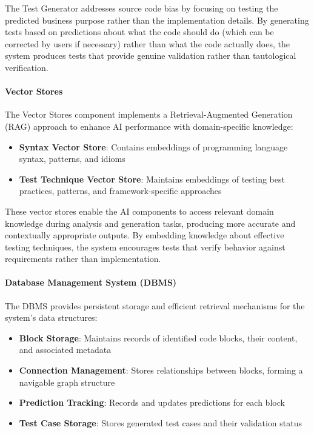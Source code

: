 \hspace{0.5cm}The Test Generator addresses source code bias by focusing on testing the predicted business purpose rather than the implementation details. By generating tests based on predictions about what the code should do (which can be corrected by users if necessary) rather than what the code actually does, the system produces tests that provide genuine validation rather than tautological verification.

\paragraph{Vector Stores}
\hspace{0.5cm}The Vector Stores component implements a Retrieval-Augmented Generation (RAG) approach to enhance AI performance with domain-specific knowledge:

\begin{itemize}
    \item \textbf{Syntax Vector Store}: Contains embeddings of programming language syntax, patterns, and idioms
    
    \item \textbf{Test Technique Vector Store}: Maintains embeddings of testing best practices, patterns, and framework-specific approaches
\end{itemize}

\hspace{0.5cm}These vector stores enable the AI components to access relevant domain knowledge during analysis and generation tasks, producing more accurate and contextually appropriate outputs. By embedding knowledge about effective testing techniques, the system encourages tests that verify behavior against requirements rather than implementation.

\paragraph{Database Management System (DBMS)}
\hspace{0.5cm}The DBMS provides persistent storage and efficient retrieval mechanisms for the system's data structures:

\begin{itemize}
    \item \textbf{Block Storage}: Maintains records of identified code blocks, their content, and associated metadata
    
    \item \textbf{Connection Management}: Stores relationships between blocks, forming a navigable graph structure
    
    \item \textbf{Prediction Tracking}: Records and updates predictions for each block
    
    \item \textbf{Test Case Storage}: Stores generated test cases and their validation status
\end{itemize}

